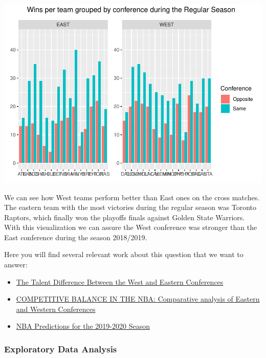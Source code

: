 \documentclass[
]{article}
\providecommand{\tightlist}{%
  \setlength{\itemsep}{0pt}\setlength{\parskip}{0pt}}
\begin{document}
\includegraphics{index_files/figure-latex/patchwork-1.pdf}

We can see how West teams perform better than East ones on the cross
matches. The eastern team with the most victories during the regular
season was Toronto Raptors, which finally won the playoffs finals
against Golden State Warriors. With this visualization we can assure the
West conference was stronger than the East conference during the season
2018/2019.

Here you will find several relevant work about this question that we
want to answer:

\begin{itemize}
\tightlist
\item
  \href{https://thegruelingtruth.com/basketball/the-talent-difference-between-the-west-and-eastern-conferences/}{The
  Talent Difference Between the West and Eastern Conferences}
\item
  \href{http://pagines.uab.cat/appliedeconomics/sites/pagines.uab.cat.appliedeconomics/files/Brosed,\%20M._paper.pdf}{COMPETITIVE
  BALANCE IN THE NBA: Comparative analysis of Eastern and Western
  Conferences}
\item
  \href{https://www.sbnation.com/nba/2019/10/22/20899122/nba-predictions-2019-2020-season-mvp-championship-nba-finals-lakers-clippers}{NBA
  Predictions for the 2019-2020 Season}
\end{itemize}

\hypertarget{exploratory-data-analysis}{%
\subsubsection{Exploratory Data
Analysis}\label{exploratory-data-analysis}}
\end{document}
